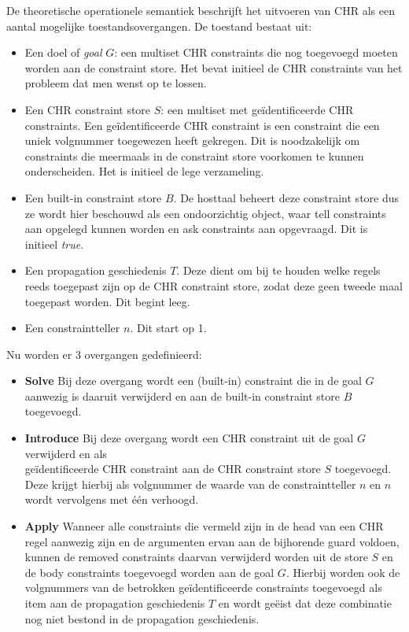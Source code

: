 De theoretische operationele semantiek beschrijft het uitvoeren van CHR als een aantal mogelijke toestandsovergangen. De toestand bestaat uit: \begin{itemize}
\item Een doel of {\em goal} $G$: een multiset CHR constraints die nog toegevoegd moeten worden aan de constraint store. Het bevat initieel de CHR constraints van het probleem dat men wenst op te lossen.
\item Een CHR constraint store $S$: een multiset met ge\"identificeerde CHR constraints. Een ge\"identificeerde CHR constraint is een constraint die een uniek volgnummer toegewezen heeft gekregen. Dit is noodzakelijk om constraints die meermaals in de constraint store voorkomen te kunnen onderscheiden. Het is initieel de lege verzameling.
\item Een built-in constraint store $B$. De hosttaal beheert deze constraint store dus ze wordt hier beschouwd als een ondoorzichtig object, waar tell constraints aan opgelegd kunnen worden en ask constraints aan opgevraagd. Dit is initieel {\em true}.
\item Een propagation geschiedenis $T$. Deze dient om bij te houden welke regels reeds toegepast zijn op de CHR constraint store, zodat deze geen tweede maal toegepast worden. Dit begint leeg. 
\item Een constraintteller $n$. Dit start op 1.
\end{itemize}

Nu worden er 3 overgangen gedefinieerd: \begin{itemize}
\item {\bf Solve} Bij deze overgang wordt een (built-in) constraint die in de goal $G$ aanwezig is daaruit verwijderd en aan de built-in constraint store $B$ toegevoegd. 
\item {\bf Introduce} Bij deze overgang wordt een CHR constraint uit de goal $G$ verwijderd en als \\ ge\"identificeerde CHR constraint aan de CHR constraint store $S$ toegevoegd. Deze krijgt hierbij als volgnummer de waarde van de constraintteller $n$ en $n$ wordt vervolgens met \'e\'en verhoogd.
\item {\bf Apply} Wanneer alle constraints die vermeld zijn in de head van een CHR regel aanwezig zijn en de argumenten ervan aan de bijhorende guard voldoen, kunnen de removed constraints daarvan verwijderd worden uit de store $S$ en de body constraints toegevoegd worden aan de goal $G$. Hierbij worden ook de volgnummers van de betrokken ge\"identificeerde constraints toegevoegd als item aan de propagation geschiedenis $T$ en wordt ge\"eist dat deze combinatie nog niet bestond in de propagation geschiedenis.
\end{itemize}

